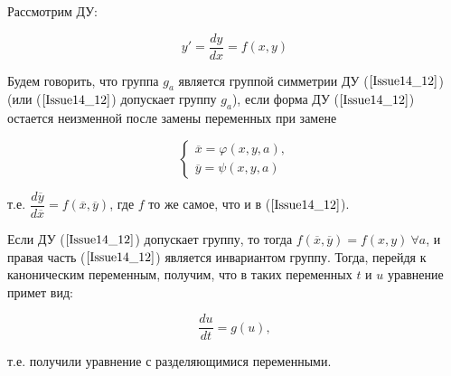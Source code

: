 Рассмотрим ДУ: 

\begin{equation}
 	y' = \dfrac{dy}{dx} = f(x,y)
 	\label{Issue14_12}
\end{equation}

Будем говорить, что группа $g_a$ является $\textbf{группой симметрии}$ ДУ ($\ref{Issue14_12}$) (или ($\ref{Issue14_12}$) допускает группу $g_a$), если форма ДУ ($\ref{Issue14_12}$) остается неизменной после замены переменных при замене 

\begin{equation}
	\begin{cases}
	\overline{x} = \varphi(x,y,a), \\
	\overline{y} = \psi(x,y,a)
	\end{cases}
\end{equation}

т.е. $\dfrac{d\overline{y}}{d\overline{x}} = f(\overline{x}, \overline{y})$, где $f$ то же самое, что и в ($\ref{Issue14_12}$).

Если ДУ ($\ref{Issue14_12}$) допускает группу, то тогда $f(\overline{x}, \overline{y}) = f(x,y)\ \forall a$, и правая часть ($\ref{Issue14_12}$) является инвариантом группу. Тогда, перейдя к каноническим переменным, получим, что в таких переменных $t$ и $u$ уравнение примет вид:

\begin{equation}
	\dfrac{du}{dt} = g(u),
	\label{Issue14_13}
\end{equation}

т.е. получили уравнение с разделяющимися переменными.




 
